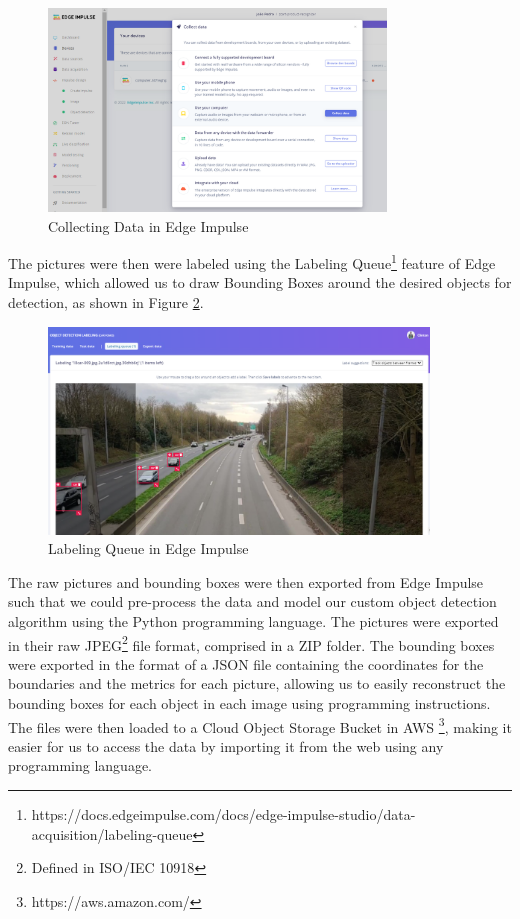 \documentclass[openright]{normas-utf-tex} %
\begin{document}
\begin{figure}[H]
	\centering
	\includegraphics[width=0.8\textwidth]{./images/edge-impulse-collect-data.png}
	\caption[Collecting Data in Edge Impulse]{Collecting Data in Edge Impulse}
    \label{fig:edgeimpulse1}
\end{figure}

The pictures were then were labeled using the Labeling
Queue\footnote{https://docs.edgeimpulse.com/docs/edge-impulse-studio/data-acquisition/labeling-queue}
feature of Edge Impulse, which allowed us to draw Bounding Boxes around the
desired objects for detection, as shown in Figure \ref{fig:edgeimpulse2}.

\begin{figure}[H]
	\centering
	\includegraphics[width=0.9\textwidth]{./images/edge-impulse-labelling-queue.png}
	\caption[Labelling Queue in Edge Impulse]{Labeling Queue in Edge Impulse}
    \label{fig:edgeimpulse2}
\end{figure}

The raw pictures and bounding boxes were then exported from Edge Impulse such
that we could pre-process the data and model our custom object detection
algorithm using the Python programming language. The pictures were exported in
their raw JPEG\footnote{Defined in ISO/IEC 10918}  file format, comprised in a
ZIP folder. The bounding boxes were exported in the format of a JSON file
containing the coordinates for the boundaries and the metrics for each picture,
allowing us to easily reconstruct the bounding boxes for each object in each
image using programming instructions. The files were then loaded to a Cloud
Object Storage Bucket in AWS \footnote{https://aws.amazon.com/}, making it
easier for us to access the data by importing it from the web using any
programming language.
\end{document}
